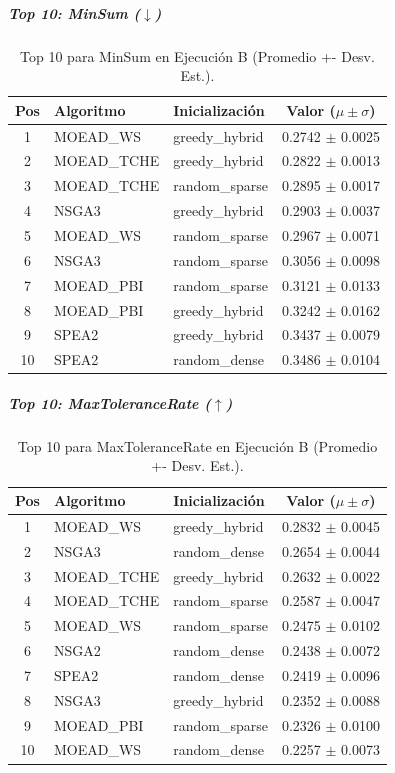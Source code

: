 \documentclass[a4paper,10pt]{article}
\begin{document}
\subparagraph{Top 10: MinSum ($\downarrow$)}
\begin{table}[H]
    \centering
    \begin{tabular}{cllc}
        \toprule
        Pos & Algoritmo & Inicialización & Valor ($\mu \pm \sigma$) \\
        \midrule
        1 & MOEAD\_WS & greedy\_hybrid & 0.2742 $\pm$ 0.0025 \\
        2 & MOEAD\_TCHE & greedy\_hybrid & 0.2822 $\pm$ 0.0013 \\
        3 & MOEAD\_TCHE & random\_sparse & 0.2895 $\pm$ 0.0017 \\
        4 & NSGA3 & greedy\_hybrid & 0.2903 $\pm$ 0.0037 \\
        5 & MOEAD\_WS & random\_sparse & 0.2967 $\pm$ 0.0071 \\
        6 & NSGA3 & random\_sparse & 0.3056 $\pm$ 0.0098 \\
        7 & MOEAD\_PBI & random\_sparse & 0.3121 $\pm$ 0.0133 \\
        8 & MOEAD\_PBI & greedy\_hybrid & 0.3242 $\pm$ 0.0162 \\
        9 & SPEA2 & greedy\_hybrid & 0.3437 $\pm$ 0.0079 \\
        10 & SPEA2 & random\_dense & 0.3486 $\pm$ 0.0104 \\
        \bottomrule
    \end{tabular}
    \caption{Top 10 para MinSum en Ejecución B (Promedio +- Desv. Est.).}
\end{table}

\subparagraph{Top 10: MaxToleranceRate ($\uparrow$)}
\begin{table}[H]
    \centering
    \begin{tabular}{cllc}
        \toprule
        Pos & Algoritmo & Inicialización & Valor ($\mu \pm \sigma$) \\
        \midrule
        1 & MOEAD\_WS & greedy\_hybrid & 0.2832 $\pm$ 0.0045 \\
        2 & NSGA3 & random\_dense & 0.2654 $\pm$ 0.0044 \\
        3 & MOEAD\_TCHE & greedy\_hybrid & 0.2632 $\pm$ 0.0022 \\
        4 & MOEAD\_TCHE & random\_sparse & 0.2587 $\pm$ 0.0047 \\
        5 & MOEAD\_WS & random\_sparse & 0.2475 $\pm$ 0.0102 \\
        6 & NSGA2 & random\_dense & 0.2438 $\pm$ 0.0072 \\
        7 & SPEA2 & random\_dense & 0.2419 $\pm$ 0.0096 \\
        8 & NSGA3 & greedy\_hybrid & 0.2352 $\pm$ 0.0088 \\
        9 & MOEAD\_PBI & random\_sparse & 0.2326 $\pm$ 0.0100 \\
        10 & MOEAD\_WS & random\_dense & 0.2257 $\pm$ 0.0073 \\
        \bottomrule
    \end{tabular}
    \caption{Top 10 para MaxToleranceRate en Ejecución B (Promedio +- Desv. Est.).}
\end{table}
\end{document}
